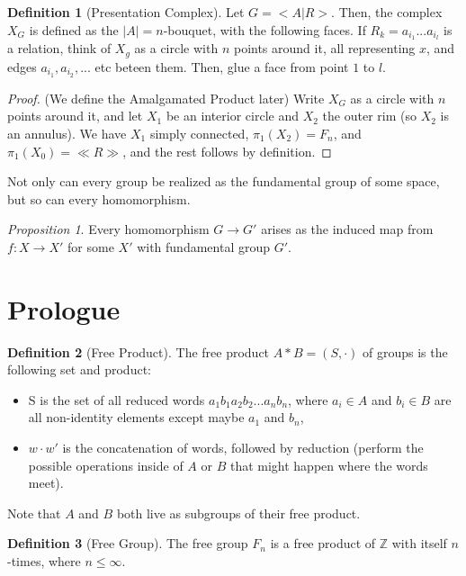 \documentclass[11pt]{article}
\theoremstyle{definition}
\newtheorem{definition}{Definition}[section]
\theoremstyle{example}
\theoremstyle{remark}
\theoremstyle{lemma}
\theoremstyle{proposition}
\newtheorem{proposition}{Proposition}[section]
\theoremstyle{Problem}
\theoremstyle{Solution}
\theoremstyle{theorem}
\theoremstyle{corollary}
\begin{document}
\begin{definition}[Presentation Complex]
Let $G=<A|R>$. Then, the complex $X_G$ is defined as the $|A|=n$-bouquet, with the following faces. If $R_k = a_{i_1} ... a_{i_l}$ is a relation, think of $X_g$ as a circle with $n$ points around it, all representing $x$, and edges $a_{i_1}, a_{i_2},...$ etc beteen them. Then, glue a face from point $1$ to $l$.
\end{definition}
\begin{proof}
(We define the Amalgamated Product later)
Write $X_G$ as a circle with $n$ points around it, and let $X_1$ be an interior circle and $X_2$ the outer rim (so $X_2$ is an annulus). We have $X_1$ simply connected, $\pi_1(X_2) = F_n$, and $\pi_1(X_0) = \ll R \gg$, and the rest follows by definition.\end{proof} 
Not only can every group be realized as the fundamental group of some space, but so can every homomorphism.
\begin{proposition}
Every homomorphism $G\to G'$ arises as the induced map from $f:X\to X'$ for some $X'$ with fundamental group $G'$.
\end{proposition}





\section{Prologue}
\begin{definition}[Free Product]
The free product $A*B = (S, \cdot)$ of groups is the following set and product:
\begin{itemize}
\item S is the set of all reduced words $a_1b_1a_2b_2...a_nb_n$, where $a_i\in A$ and $b_i\in B$ are all non-identity elements except maybe $a_1$ and $b_n$,
\item $w\cdot w'$ is the concatenation of words, followed by reduction (perform the possible operations inside of $A$ or $B$ that might happen where the words meet).
\end{itemize}
Note that $A$ and $B$ both live as subgroups of their free product.
\end{definition}

\begin{definition}[Free Group]
The free group $F_n$ is a free product of $\mathbb{Z}$ with itself $n$-times, where $n\leq \infty$.
\end{definition}
\end{document}
